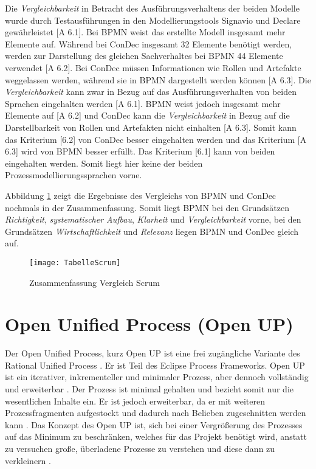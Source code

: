 Die \textit{Vergleichbarkeit} in Betracht des Ausführungsverhaltens der beiden Modelle wurde durch Testausführungen in den Modellierungstools Signavio und Declare gewährleistet [A 6.1].\newline
Bei BPMN weist das erstellte Modell insgesamt mehr Elemente auf. Während bei ConDec insgesamt 32 Elemente benötigt werden, werden zur Darstellung des gleichen Sachverhaltes bei BPMN 44 Elemente verwendet [A 6.2]. \newline
Bei ConDec müssen Informationen wie Rollen und Artefakte weggelassen werden, während sie in BPMN dargestellt werden können [A 6.3].\newline
Die \textit{Vergleichbarkeit} kann zwar in Bezug auf das Ausführungsverhalten von beiden Sprachen eingehalten werden [A 6.1]. BPMN weist jedoch insgesamt mehr Elemente auf [A 6.2] und ConDec kann die \textit{Vergleichbarkeit} in Bezug auf die Darstellbarkeit von Rollen und Artefakten nicht einhalten [A 6.3]. Somit kann das Kriterium [6.2] von ConDec besser eingehalten werden und das Kriterium [A 6.3] wird von BPMN besser erfüllt. Das Kriterium [6.1] kann von beiden eingehalten werden. Somit liegt hier keine der beiden Prozessmodellierungssprachen vorne.\newline

Abbildung \ref{fig:TabelleScrum} zeigt die Ergebnisse des Vergleichs von BPMN und ConDec nochmals in der Zusammenfassung. Somit liegt BPMN bei den Grundsätzen \textit{Richtigkeit}, \textit{systematischer Aufbau}, \textit{Klarheit} und \textit{Vergleichbarkeit} vorne, bei den Grundsätzen \textit{Wirtschaftlichkeit} und \textit{Relevanz} liegen BPMN und ConDec gleich auf. \newline

\begin{figure}[htp]
\begin{center}
  \texttt{[image: TabelleScrum]} %
  \caption{Zusammenfassung Vergleich Scrum}
  \label{fig:TabelleScrum}
\end{center}
\end{figure}




\section{Open Unified Process (Open UP)}


Der Open Unified Process, kurz Open UP ist eine frei zugängliche Variante des Rational Unified Process \cite{hauber2010}. Er ist Teil des Eclipse Process Frameworks. Open UP ist ein iterativer, inkrementeller und minimaler Prozess, aber dennoch vollständig und erweiterbar \cite{Gau2006, Basem2010}. Der Prozess ist minimal gehalten und bezieht somit nur die wesentlichen Inhalte ein. Er ist jedoch erweiterbar, da er mit weiteren Prozessfragmenten aufgestockt und dadurch nach Belieben zugeschnitten werden kann \cite{Wang2007}. Das Konzept des Open UP ist, sich bei einer Vergrößerung des Prozesses auf das Minimum zu beschränken, welches für das Projekt benötigt wird, anstatt zu versuchen große, überladene Prozesse zu verstehen und diese dann zu verkleinern \cite{ambler2012}.  \newline


